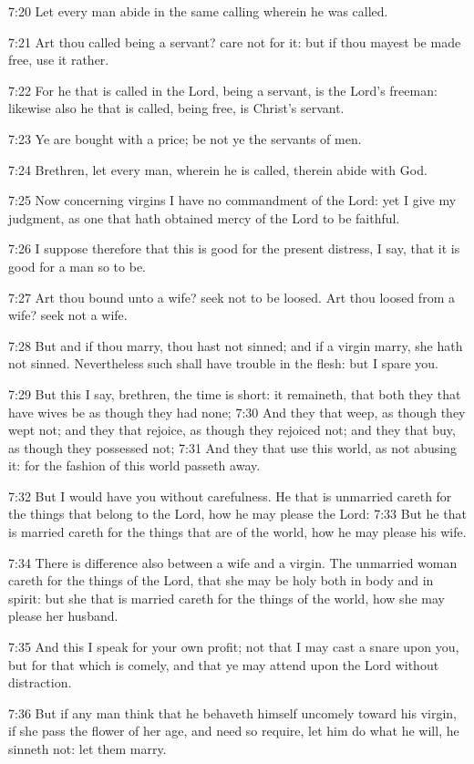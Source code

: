 7:20 Let every man abide in the same calling wherein he was called.

7:21 Art thou called being a servant? care not for it: but if thou mayest be made free, use it rather.

7:22 For he that is called in the Lord, being a servant, is the Lord's freeman: likewise also he that is called, being free, is Christ's servant.

7:23 Ye are bought with a price; be not ye the servants of men.

7:24 Brethren, let every man, wherein he is called, therein abide with God.

7:25 Now concerning virgins I have no commandment of the Lord: yet I give my judgment, as one that hath obtained mercy of the Lord to be faithful.

7:26 I suppose therefore that this is good for the present distress, I say, that it is good for a man so to be.

7:27 Art thou bound unto a wife? seek not to be loosed. Art thou loosed from a wife? seek not a wife.

7:28 But and if thou marry, thou hast not sinned; and if a virgin marry, she hath not sinned. Nevertheless such shall have trouble in the flesh: but I spare you.

7:29 But this I say, brethren, the time is short: it remaineth, that both they that have wives be as though they had none; 7:30 And they that weep, as though they wept not; and they that rejoice, as though they rejoiced not; and they that buy, as though they possessed not; 7:31 And they that use this world, as not abusing it: for the fashion of this world passeth away.

7:32 But I would have you without carefulness. He that is unmarried careth for the things that belong to the Lord, how he may please the Lord: 7:33 But he that is married careth for the things that are of the world, how he may please his wife.

7:34 There is difference also between a wife and a virgin. The unmarried woman careth for the things of the Lord, that she may be holy both in body and in spirit: but she that is married careth for the things of the world, how she may please her husband.

7:35 And this I speak for your own profit; not that I may cast a snare upon you, but for that which is comely, and that ye may attend upon the Lord without distraction.

7:36 But if any man think that he behaveth himself uncomely toward his virgin, if she pass the flower of her age, and need so require, let him do what he will, he sinneth not: let them marry.

